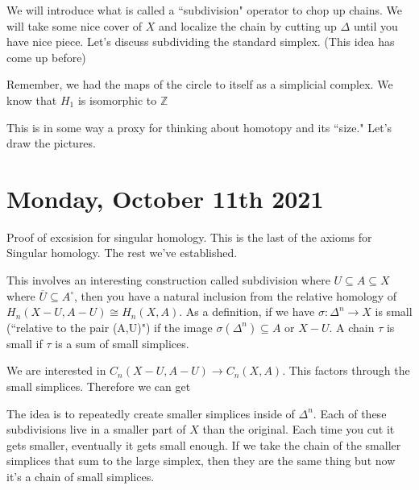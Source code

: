 \documentclass[12pt]{article}
\theoremstyle{definition}
\begin{document}
	We will introduce what is called a ``subdivision" operator to chop up chains. We will take some nice cover of $X$ and localize the chain by cutting up $\Delta$ until you have nice piece. Let's discuss subdividing the standard simplex. (This idea has come up before)
	
	
	Remember, we had the maps of the circle to itself as a simplicial complex. We know that $H_1$ is isomorphic to $\mathbb{Z}$
	
	This is in some way a proxy for thinking about homotopy and its ``size." Let's draw the pictures. 
	
	\section{Monday, October 11th 2021}
	Proof of excsision for singular homology. This is the last of the axioms for Singular homology. The rest we've established.
	
	This involves an interesting construction called subdivision where $U\subseteq A\subseteq X$ where $\overline{U}\subseteq A^\circ$, then you have a natural inclusion from the relative homology of $H_n(X-U, A-U)\cong H_n(X,A)$. As a definition, if we have $\sigma:\Delta^n\to X$ is small (``relative to the pair (A,U)") if the image $\sigma(\Delta^n)\subseteq A$ or $X-U$. A chain $\tau$ is small if $\tau$ is a sum of small simplices. 
	
	We are interested in $C_n(X-U,A-U)\to C_n(X,A)$. This factors through the small simplices. Therefore we can get\begin{center}
	\end{center}
	The idea is to repeatedly create smaller simplices inside of $\Delta^n$. Each of these subdivisions live in a smaller part of $X$ than the original. Each time you cut it gets smaller, eventually it gets small enough. If we take the chain of the smaller simplices that sum to the large simplex, then they are the same thing but now it's a chain of small simplices. 
	
\end{document}
